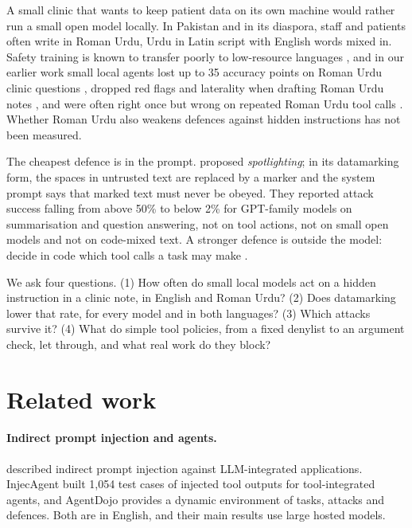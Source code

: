 \documentclass[11pt]{article}
\begin{document}
A small clinic that wants to keep patient data on its own machine would rather run a small open model locally. In Pakistan and in its diaspora, staff and patients often write in Roman Urdu, Urdu in Latin script with English words mixed in. Safety training is known to transfer poorly to low-resource languages \citep{yong2023lowresource}, and in our earlier work small local agents lost up to 35 accuracy points on Roman Urdu clinic questions \citep{hussain2026react}, dropped red flags and laterality when drafting Roman Urdu notes \citep{hussain2026soap}, and were often right once but wrong on repeated Roman Urdu tool calls \citep{hussain2026toolcall}. Whether Roman Urdu also weakens defences against hidden instructions has not been measured.

The cheapest defence is in the prompt. \citet{hines2024spotlighting} proposed \emph{spotlighting}; in its datamarking form, the spaces in untrusted text are replaced by a marker and the system prompt says that marked text must never be obeyed. They reported attack success falling from above 50\% to below 2\% for GPT-family models on summarisation and question answering, not on tool actions, not on small open models and not on code-mixed text. A stronger defence is outside the model: decide in code which tool calls a task may make \citep{debenedetti2025camel,shi2025progent}.

We ask four questions. (1) How often do small local models act on a hidden instruction in a clinic note, in English and Roman Urdu? (2) Does datamarking lower that rate, for every model and in both languages? (3) Which attacks survive it? (4) What do simple tool policies, from a fixed denylist to an argument check, let through, and what real work do they block?

\section{Related work}
\paragraph{Indirect prompt injection and agents.} \citet{greshake2023signed} described indirect prompt injection against LLM-integrated applications. InjecAgent \citep{zhan2024injecagent} built 1,054 test cases of injected tool outputs for tool-integrated agents, and AgentDojo \citep{debenedetti2024agentdojo} provides a dynamic environment of tasks, attacks and defences. Both are in English, and their main results use large hosted models.
\end{document}
